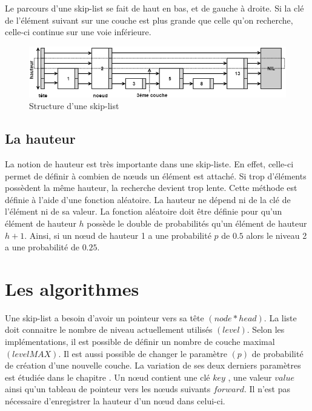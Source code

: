 \documentclass[hidelinks,a4paper, 12pt]{article}
\begin{document}
	Le parcours d'une skip-list se fait de haut en bas, et de gauche à droite. Si la clé de l'élément suivant sur une couche est plus grande que celle qu'on recherche, celle-ci continue sur une voie inférieure.	
	
	\begin{figure}
		\includegraphics[width=\textwidth]{img/struct}
		\caption{Structure d'une skip-list}
		\label{StructSkip}
	\end{figure}
	
	\subsection{La hauteur}
	La notion de hauteur est très importante dans une skip-liste. En effet, celle-ci permet de définir à combien de nœuds un élément est attaché. Si trop d'éléments possèdent la même hauteur, la recherche devient trop lente.	Cette méthode est définie à l'aide d'une fonction aléatoire. La hauteur ne dépend ni de la clé de l'élément ni de sa valeur. La fonction aléatoire doit être définie pour qu'un élément de hauteur $h$ possède le double de probabilités qu'un élément de hauteur $h+1$. Ainsi, si un nœud de hauteur 1 a une probabilité $p$ de $0.5$ alors le niveau 2 a une probabilité de $0.25$.
		
	\newpage
	\section{Les algorithmes}
	Une skip-list a besoin d'avoir un pointeur vers sa tête $(node* head)$. La liste doit connaitre le nombre de niveau actuellement utilisés $(level)$. Selon les implémentations, il est possible de définir un nombre de couche maximal $(levelMAX)$. Il est aussi possible de changer le paramètre $(p)$ de probabilité de création d'une nouvelle couche. La variation de ses deux derniers paramètres est étudiée dans le chapitre .
	Un nœud contient une clé $key$ , une valeur $value$ ainsi qu'un tableau de pointeur vers les nœuds suivants $forward$. Il n'est pas nécessaire d'enregistrer la hauteur d'un nœud dans celui-ci.
	
	
\end{document}
